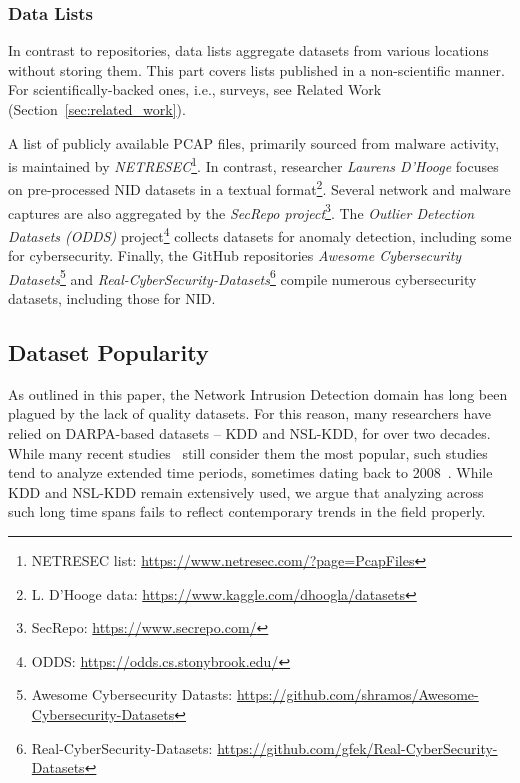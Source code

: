 \subsubsection{Data Lists}

In contrast to repositories, data lists aggregate datasets from various locations without storing them. This part covers lists published in a non-scientific manner. For scientifically-backed ones, i.e., surveys, see Related Work (Section~\ref{sec:related_work}).

A list of publicly available PCAP files, primarily sourced from malware activity, is maintained by \emph{NETRESEC}\footnote{NETRESEC list: \url{https://www.netresec.com/?page=PcapFiles}}. In contrast, researcher \emph{Laurens D'Hooge} focuses on pre-processed NID datasets in a textual format\footnote{L. D'Hooge data: \url{https://www.kaggle.com/dhoogla/datasets}}. Several network and malware captures are also aggregated by the \emph{SecRepo project}\footnote{SecRepo: \url{https://www.secrepo.com/}}. The \emph{Outlier Detection Datasets (ODDS)} project\footnote{ODDS: \url{https://odds.cs.stonybrook.edu/}} collects datasets for anomaly detection, including some for cybersecurity. Finally, the GitHub repositories \emph{Awesome Cybersecurity Datasets}\footnote{Awesome Cybersecurity Datasts: \url{https://github.com/shramos/Awesome-Cybersecurity-Datasets}} and \emph{Real-CyberSecurity-Datasets}\footnote{Real-CyberSecurity-Datasets: \url{https://github.com/gfek/Real-CyberSecurity-Datasets}} compile numerous cybersecurity datasets, including those for NID.

\subsection{Dataset Popularity}
\label{ssec:ndatasurv_popularity}

As outlined in this paper, the Network Intrusion Detection domain has long been plagued by the lack of quality datasets. For this reason, many researchers have relied on DARPA-based datasets -- KDD and NSL-KDD, for over two decades. While many recent studies~\cite{abdulganiyu2023_slr_nids, yang2022_slr_anids, ahmed2022_nids_dataset_survey, hindy2020_network_threats_taxonomy} still consider them the most popular, such studies tend to analyze extended time periods, sometimes dating back to 2008~\cite{hindy2020_network_threats_taxonomy}. While  KDD and NSL-KDD remain extensively used, we argue that analyzing across such long time spans fails to reflect contemporary trends in the field properly.

